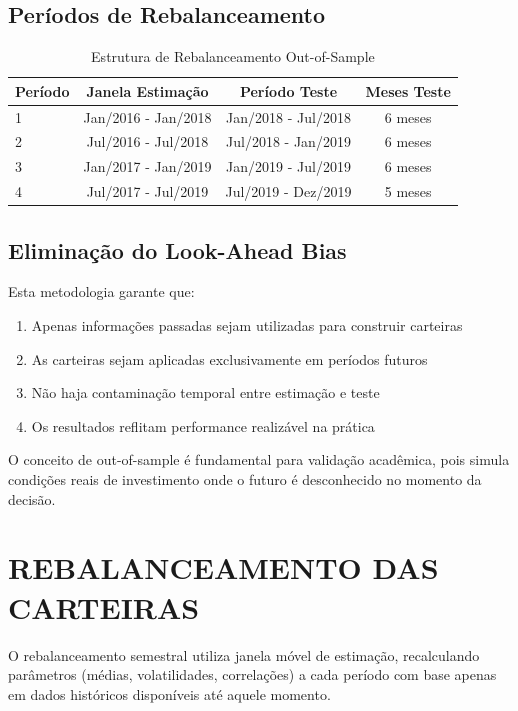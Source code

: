 \subsection{Períodos de Rebalanceamento}

\begin{table}[H]
\centering
\caption{Estrutura de Rebalanceamento Out-of-Sample}
\begin{tabular}{lccc}
\toprule
\textbf{Período} & \textbf{Janela Estimação} & \textbf{Período Teste} & \textbf{Meses Teste} \\
\midrule
1 & Jan/2016 - Jan/2018 & Jan/2018 - Jul/2018 & 6 meses \\
2 & Jul/2016 - Jul/2018 & Jul/2018 - Jan/2019 & 6 meses \\
3 & Jan/2017 - Jan/2019 & Jan/2019 - Jul/2019 & 6 meses \\
4 & Jul/2017 - Jul/2019 & Jul/2019 - Dez/2019 & 5 meses \\
\bottomrule
\end{tabular}
\label{tab:rebalanceamento}
\end{table}

\subsection{Eliminação do Look-Ahead Bias}

Esta metodologia garante que:
\begin{enumerate}
    \item Apenas informações passadas sejam utilizadas para construir carteiras
    \item As carteiras sejam aplicadas exclusivamente em períodos futuros
    \item Não haja contaminação temporal entre estimação e teste
    \item Os resultados reflitam performance realizável na prática
\end{enumerate}

O conceito de out-of-sample é fundamental para validação acadêmica, pois simula condições reais de investimento onde o futuro é desconhecido no momento da decisão.

\section{REBALANCEAMENTO DAS CARTEIRAS}

O rebalanceamento semestral utiliza janela móvel de estimação, recalculando parâmetros (médias, volatilidades, correlações) a cada período com base apenas em dados históricos disponíveis até aquele momento.

